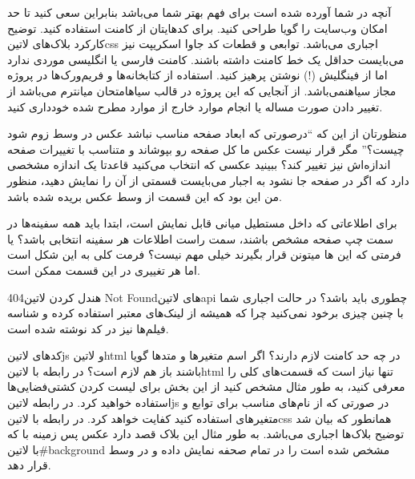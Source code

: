 
 آنچه در شما آورده شده است برای فهم بهتر شما می‌باشد بنابراین سعی کنید تا حد امکان وب‌سایت را گویا طراحی کنید.
 برای کدهایتان از کامنت استفاده کنید. توضیح کارکرد بلاک‌های ‌لاتین{css} اجباری می‌باشد. توابعی و قطعات کد جاوا اسکریپت نیز می‌بایست حداقل یک خط کامنت داشته باشند.
 کامنت فارسی یا انگلیسی موردی ندارد اما از فینگلیش (!) نوشتن پرهیز کنید.
 استفاده از کتابخانه‌ها و فریم‌ورک‌ها در پروژه مجاز ‌سیاه{نمی‌باشد}.
 از آنجایی که این پروژه در قالب ‌سیاه{امتحان میانترم} می‌باشد از تغییر دادن صورت مساله یا انجام موارد خارج از موارد مطرح شده خودداری کنید.


 منظورتان از این که ``درصورتی که ابعاد صفحه مناسب نباشد عکس در وسط زوم شود چیست؟''
مگر قرار نیست عکس ما کل صفحه رو بپوشاند و متناسب با تغییرات صفحه اندازه‌اش نیز تغییر کند؟
 ببینید عکسی که انتخاب می‌کنید قاعدتا یک اندازه مشخصی دارد که اگر در صفحه جا نشود به اجبار می‌بایست
قسمتی از آن را نمایش دهید، منظور من این بود که این قسمت از وسط عکس بریده شده باشد.

 برای اطلاعاتی که داخل مستطیل میانی قابل نمایش است،
ابتدا باید همه سفینه‌ها در سمت چپ صفحه مشخص باشند، سمت راست اطلاعات هر سفینه انتخابی باشد؟ یا فرمتی که این ها میتونن قرار بگیرند خیلی مهم نیست؟
 فرمت کلی به این شکل است اما هر تغییری در این قسمت ممکن است.

 هندل کردن ‌لاتین{404 Not Found}های ‌لاتین{api} چطوری باید باشد؟
 در حالت اجباری شما با چنین چیزی برخود نمی‌کنید چرا که همیشه از لینک‌های معتبر استفاده کرده
و شناسه فیلم‌ها نیز در کد نوشته شده است.

 کدهای ‌لاتین{js} و ‌لاتین{html} در چه حد کامنت لازم دارند؟ اگر اسم متغیرها و متدها گویا باشند باز هم لازم است؟
 در رابطه با ‌لاتین{html} تنها نیاز است که قسمت‌های کلی را معرفی کنید،
به طور مثال مشخص کنید از این بخش برای لیست کردن کشتی‌فضایی‌ها استفاده خواهید کرد.
در رابطه ‌لاتین{js} در صورتی که از نام‌های مناسب برای توابع و متغیرهای استفاده کنید کفایت خواهد کرد.
در رابطه با ‌لاتین{css} همانطور که بیان شد توضیح بلاک‌ها اجباری می‌باشد.
به طور مثال این بلاک قصد دارد عکس پس زمینه با که با ‌لاتین{\#background} مشخص شده است را در تمام صحفه نمایش داده و در وسط قرار دهد.

